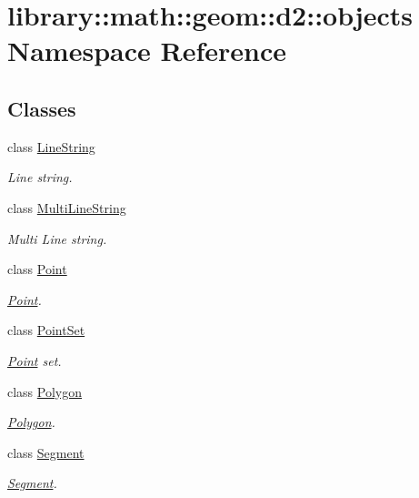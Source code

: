 \hypertarget{namespacelibrary_1_1math_1_1geom_1_1d2_1_1objects}{}\section{library\+:\+:math\+:\+:geom\+:\+:d2\+:\+:objects Namespace Reference}
\label{namespacelibrary_1_1math_1_1geom_1_1d2_1_1objects}
\subsection*{Classes}
\begin{DoxyCompactItemize}
\item 
class \hyperlink{classlibrary_1_1math_1_1geom_1_1d2_1_1objects_1_1_line_string}{Line\+String}
\begin{DoxyCompactList}\small\item\em Line string. \end{DoxyCompactList}\item 
class \hyperlink{classlibrary_1_1math_1_1geom_1_1d2_1_1objects_1_1_multi_line_string}{Multi\+Line\+String}
\begin{DoxyCompactList}\small\item\em Multi Line string. \end{DoxyCompactList}\item 
class \hyperlink{classlibrary_1_1math_1_1geom_1_1d2_1_1objects_1_1_point}{Point}
\begin{DoxyCompactList}\small\item\em \hyperlink{classlibrary_1_1math_1_1geom_1_1d2_1_1objects_1_1_point}{Point}. \end{DoxyCompactList}\item 
class \hyperlink{classlibrary_1_1math_1_1geom_1_1d2_1_1objects_1_1_point_set}{Point\+Set}
\begin{DoxyCompactList}\small\item\em \hyperlink{classlibrary_1_1math_1_1geom_1_1d2_1_1objects_1_1_point}{Point} set. \end{DoxyCompactList}\item 
class \hyperlink{classlibrary_1_1math_1_1geom_1_1d2_1_1objects_1_1_polygon}{Polygon}
\begin{DoxyCompactList}\small\item\em \hyperlink{classlibrary_1_1math_1_1geom_1_1d2_1_1objects_1_1_polygon}{Polygon}. \end{DoxyCompactList}\item 
class \hyperlink{classlibrary_1_1math_1_1geom_1_1d2_1_1objects_1_1_segment}{Segment}
\begin{DoxyCompactList}\small\item\em \hyperlink{classlibrary_1_1math_1_1geom_1_1d2_1_1objects_1_1_segment}{Segment}. \end{DoxyCompactList}\end{DoxyCompactItemize}
